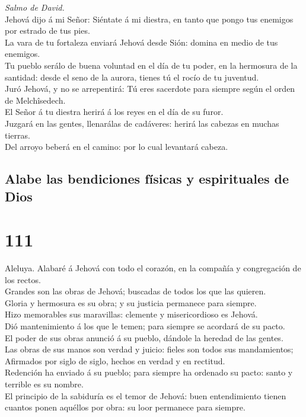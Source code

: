  \emph{Salmo de David.}\\
Jehová dijo á mi Señor: Siéntate á mi diestra, en tanto que pongo tus
enemigos por estrado de tus pies.\\
 La vara de tu fortaleza enviará Jehová desde Sión: domina
en medio de tus enemigos.\\
 Tu pueblo serálo de buena voluntad en el día de tu poder,
en la hermosura de la santidad: desde el seno de la aurora, tienes tú el
rocío de tu juventud.\\
 Juró Jehová, y no se arrepentirá: Tú eres sacerdote para
siempre según el orden de Melchîsedech.\\
 El Señor á tu diestra herirá á los reyes en el día de su
furor.\\
 Juzgará en las gentes, llenarálas de cadáveres: herirá las
cabezas en muchas tierras.\\
 Del arroyo beberá en el camino: por lo cual levantará
cabeza.

\hypertarget{alabe-las-bendiciones-fuxedsicas-y-espirituales-de-dios}{%
\subsection{Alabe las bendiciones físicas y espirituales de
Dios}\label{alabe-las-bendiciones-fuxedsicas-y-espirituales-de-dios}}

\hypertarget{section-110}{%
\section{111}\label{section-110}}

 Aleluya. Alabaré á Jehová con todo el corazón, en la
compañía y congregación de los rectos.\\
 Grandes son las obras de Jehová; buscadas de todos los que
las quieren.\\
 Gloria y hermosura es su obra; y su justicia permanece para
siempre.\\
 Hizo memorables sus maravillas: clemente y misericordioso
es Jehová.\\
 Dió mantenimiento á los que le temen; para siempre se
acordará de su pacto.\\
 El poder de sus obras anunció á su pueblo, dándole la
heredad de las gentes.\\
 Las obras de sus manos son verdad y juicio: fieles son
todos sus mandamientos;\\
 Afirmados por siglo de siglo, hechos en verdad y en
rectitud.\\
 Redención ha enviado á su pueblo; para siempre ha ordenado
su pacto: santo y terrible es su nombre.\\
 El principio de la sabiduría es el temor de Jehová: buen
entendimiento tienen cuantos ponen aquéllos por obra: su loor permanece
para siempre.

